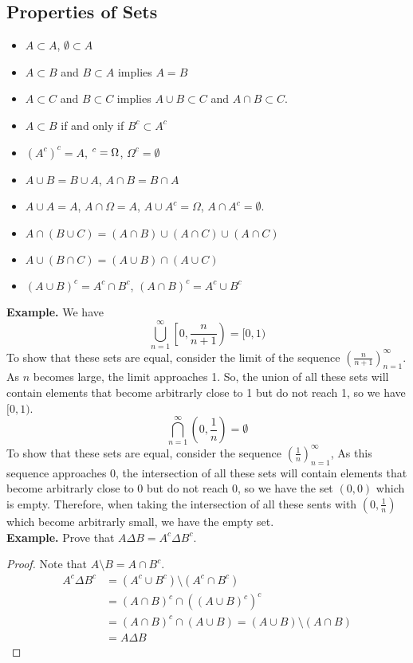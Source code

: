 \subsection{Properties of Sets}
\begin{itemize}
    \item $A \subset A$, $\emptyset \subset A$
    \item $A \subset B$ and $B \subset A$ implies $A = B$
    \item $A \subset C$ and $B \subset C$ implies $A \cup B \subset C$ and $A \cap B \subset C$. 
    \item $A \subset B$ if and only if $B^c \subset A^c$
    \item $(A^c)^c = A$, $\empty^c = \Omega$, $\Omega^c = \emptyset$
    \item $A \cup B = B \cup A$, $A \cap B = B \cap A$
    \item $A \cup A = A$, $A \cap \Omega = A$, $A \cup A^c = \Omega$, $A \cap A^c = \emptyset$. 
    \item $A \cap (B \cup C) = (A \cap B) \cup (A \cap C) \cup (A \cap C)$
    \item $A \cup (B \cap C) = (A \cup B) \cap (A \cup C)$
    \item $(A \cup B)^c = A^c \cap B^c$, $(A \cap B)^c = A^c \cup B^c$
\end{itemize}
\textbf{Example.} We have 
\[\bigcup_{n=1}^\infty \left[0, \frac{n}{n+1}\right) = [0,1)\]
To show that these sets are equal, consider the limit of the sequence $\left(\frac{n}{n+1}\right)_{n=1}^\infty$. As $n$ becomes large, the limit approaches 1. So, the union of all these sets will contain elements that become arbitrarly close to 1 but do not reach 1, so we have $[0,1)$.
\[\bigcap_{n=1}^\infty \left(0, \frac{1}{n}\right) = \emptyset\]
To show that these sets are equal, consider the sequence $\left(\frac{1}{n}\right)_{n=1}^\infty$, As this sequence approaches 0, the intersection of all these sets will contain elements that become arbitrarly close to 0 but do not reach 0, so we have the set $(0, 0)$ which is empty. Therefore, when taking the intersection of all these sents with $\left(0, \frac{1}{n}\right)$ which become arbitrarly small, we have the empty set.\\[2ex]
\noindent
\textbf{Example.} Prove that $A \Delta B = A^c \Delta B^c$.
\begin{proof}
    Note that $A \setminus B = A \cap B^c$. 
    \begin{align*}
        A^c \Delta B^c &= (A^c \cup B^c) \setminus (A^c \cap B^c)\\
        &= (A \cap B)^c \cap ((A \cup B)^c)^c\\ 
        &= (A \cap B)^c \cap (A \cup B) = (A \cup B) \setminus (A \cap B) \\
        &= A \Delta B  
    \end{align*}
\end{proof}
